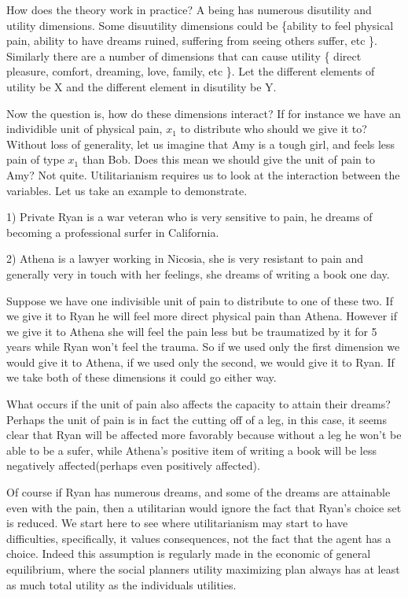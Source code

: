How does the theory work in practice? A being has numerous disutility and utility dimensions. Some disuutility dimensions could be \{ability to feel physical pain, ability to have dreams ruined, suffering from seeing others suffer, etc \}. Similarly there are a number of dimensions that can cause utility \{ direct pleasure, comfort, dreaming, love, family, etc \}. Let the different elements of utility be X and the different element in disutility be Y. 

Now the question is, how do these dimensions interact? If for instance we have an individible unit of physical pain, $x_1$ to distribute who should we give it to? Without loss of generality, let us imagine that Amy is a tough girl, and feels less pain of type $x_1$ than Bob. Does this mean we should give the unit of pain to Amy? Not quite. Utilitarianism requires us to look at the interaction between the variables. Let us take an example to demonstrate. 

1) Private Ryan is a war veteran who is very sensitive to pain, he dreams of becoming a professional surfer in California. 

2) Athena is a lawyer working in Nicosia, she is very resistant to pain and generally very in touch with her feelings, she dreams of writing a book one day.

Suppose we have one indivisible unit of pain to distribute to one of these two. If we give it to Ryan he will feel more direct physical pain than Athena. However if we give it to Athena she will feel the pain less but be traumatized by it for 5 years while Ryan won't feel the trauma. So if we used only the first dimension we would give it to Athena, if we used only the second, we would give it to Ryan. If we take both of these dimensions it could go either way. 

What occurs if the unit of pain also affects the capacity to attain their dreams? Perhaps the unit of pain is in fact the cutting off of a leg, in this case, it seems clear that Ryan will be affected more favorably because without a leg he won't be able to be a sufer, while Athena's positive item of writing a book will be less negatively affected(perhaps even positively affected). 

Of course if Ryan has numerous dreams, and some of the dreams are attainable even with the pain, then a utilitarian would ignore the fact that Ryan's choice set is reduced. We start here to see where utilitarianism may start to have difficulties, specifically, it values consequences, not the fact that the agent has a choice. Indeed this assumption is regularly made in the economic of general equilibrium, where the social planners utility maximizing plan always has at least as much total utility as the individuals utilities. 

